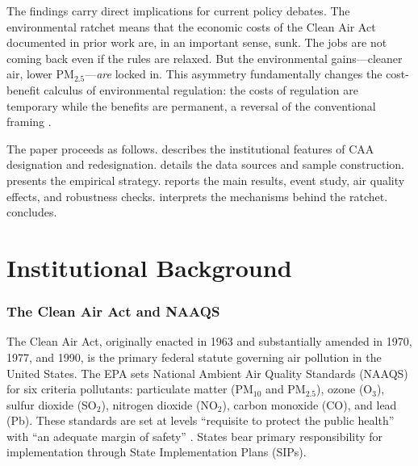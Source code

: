 \documentclass[12pt]{article}
\begin{document}
The findings carry direct implications for current policy debates. The environmental ratchet means that the economic costs of the Clean Air Act documented in prior work are, in an important sense, sunk. The jobs are not coming back even if the rules are relaxed. But the environmental gains---cleaner air, lower PM$_{2.5}$---\textit{are} locked in. This asymmetry fundamentally changes the cost-benefit calculus of environmental regulation: the costs of regulation are temporary while the benefits are permanent, a reversal of the conventional framing \citep{Shapiro2018, Fowlie2012, ZivinNeidell2012}.

The paper proceeds as follows.  describes the institutional features of CAA designation and redesignation.  details the data sources and sample construction.  presents the empirical strategy.  reports the main results, event study, air quality effects, and robustness checks.  interprets the mechanisms behind the ratchet.  concludes.


\section{Institutional Background}
\label{sec:background}

\subsubsection*{The Clean Air Act and NAAQS} The Clean Air Act, originally enacted in 1963 and substantially amended in 1970, 1977, and 1990, is the primary federal statute governing air pollution in the United States. The EPA sets National Ambient Air Quality Standards (NAAQS) for six criteria pollutants: particulate matter (PM$_{10}$ and PM$_{2.5}$), ozone (O$_3$), sulfur dioxide (SO$_2$), nitrogen dioxide (NO$_2$), carbon monoxide (CO), and lead (Pb). These standards are set at levels ``requisite to protect the public health'' with ``an adequate margin of safety'' \citep{FerrisGarbaccioMarten2017}. States bear primary responsibility for implementation through State Implementation Plans (SIPs).
\end{document}
